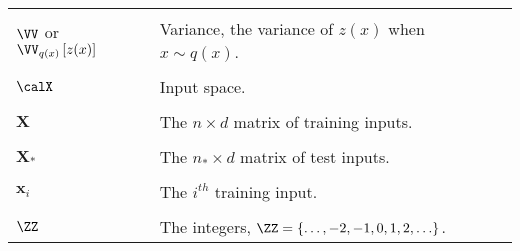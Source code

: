 \begin{longtable}{lp{}}
    \\\\
    $\VV$ or $\VV_{q(x)} \left[ z(x) \right]$                                                                  & Variance, the variance of $z(x)$ when $x \sim q(x)$.
    \\\\
    $\calX$                                                                                                    & Input space.
    \\\\
    $\bm{X}$                                                                                                   & The $n \times d$ matrix of training inputs.
    \\\\
    $\bm{X}_{\ast}$                                                                                            & The $n_{\ast} \times d$ matrix of test inputs.
    \\\\
    $\bm{x}_{i}$                                                                                               & The $i^{th}$ training input.
    \\\\
    $\ZZ$                                                                                                      & The integers, $\ZZ = \left\{ \ldots ,-2,-1,0,1,2,\ldots \right\}$.

    \\\bottomrule
    \hline
\end{longtable}

